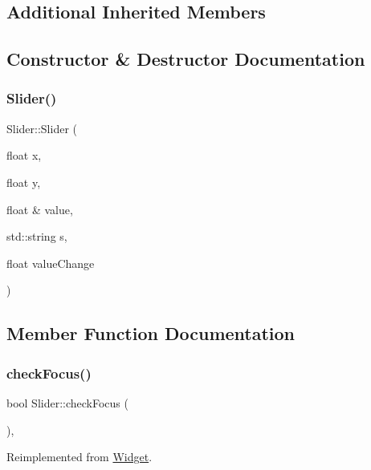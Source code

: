 \subsection*{Additional Inherited Members}


\subsection{Constructor \& Destructor Documentation}
\mbox{\label{class_slider_a5c41dd3b21735a54ae5d94090bcdcae4}} 
\subsubsection{\texorpdfstring{Slider()}{Slider()}}
{\footnotesize\ttfamily Slider\+::\+Slider (\begin{DoxyParamCaption}\item[{float}]{x,  }\item[{float}]{y,  }\item[{float \&}]{value,  }\item[{std\+::string}]{s,  }\item[{float}]{value\+Change }\end{DoxyParamCaption})}



\subsection{Member Function Documentation}
\mbox{\label{class_slider_ab81e90562123cacd8f624b326b9b3f3e}} 
\subsubsection{\texorpdfstring{checkFocus()}{checkFocus()}}
{\footnotesize\ttfamily bool Slider\+::check\+Focus (\begin{DoxyParamCaption}{ }\end{DoxyParamCaption})\hspace{0.3cm}{\ttfamily [override]}, {\ttfamily [virtual]}}



Reimplemented from \mbox{\hyperlink{class_widget_ac8121758d9fcfedb4ff119abeb7d0652}{Widget}}.

\mbox{\label{class_slider_ae8bf6bef11bae69bc6a01276b6ad7ddd}} 
